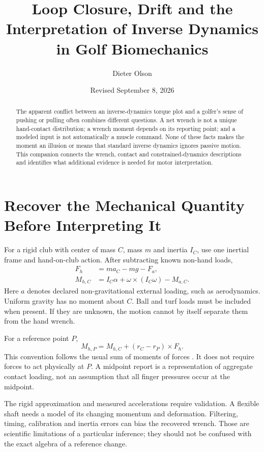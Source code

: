 \documentclass[11pt,a4paper]{article}
\title{Loop Closure, Drift and the Interpretation of Inverse Dynamics in Golf Biomechanics}
\author{Dieter Olson}\date{Revised September 8, 2026}
\begin{document}
\maketitle
\begin{abstract}
The apparent conflict between an inverse-dynamics torque plot and a golfer's sense of pushing or pulling often combines different questions. A net wrench is not a unique hand-contact distribution; a wrench moment depends on its reporting point; and a modeled input is not automatically a muscle command. None of these facts makes the moment an illusion or means that standard inverse dynamics ignores passive motion. This companion connects the wrench, contact and constrained-dynamics descriptions and identifies what additional evidence is needed for motor interpretation.
\end{abstract}

\section{Recover the Mechanical Quantity Before Interpreting It}
For a rigid club with center of mass $C$, mass $m$ and inertia $I_C$, use one inertial frame and hand-on-club action. After subtracting known non-hand loads,
\begin{align}
F_h&=ma_C-mg-F_a,\\
M_{h,C}&=I_C\alpha+\omega\times(I_C\omega)-M_{a,C}.
\end{align}
Here $a$ denotes declared non-gravitational external loading, such as aerodynamics. Uniform gravity has no moment about $C$. Ball and turf loads must be included when present. If they are unknown, the motion cannot by itself separate them from the hand wrench.

For a reference point $P$,
\begin{equation}
M_{h,P}=M_{h,C}+(r_C-r_P)\times F_h.
\end{equation}
This convention follows the usual sum of moments of forces \cite{lynch}. It does not require forces to act physically at $P$. A midpoint report is a representation of aggregate contact loading, not an assumption that all finger pressures occur at the midpoint.

The rigid approximation and measured accelerations require validation. A flexible shaft needs a model of its changing momentum and deformation. Filtering, timing, calibration and inertia errors can bias the recovered wrench. Those are scientific limitations of a particular inference; they should not be confused with the exact algebra of a reference change.
\end{document}
